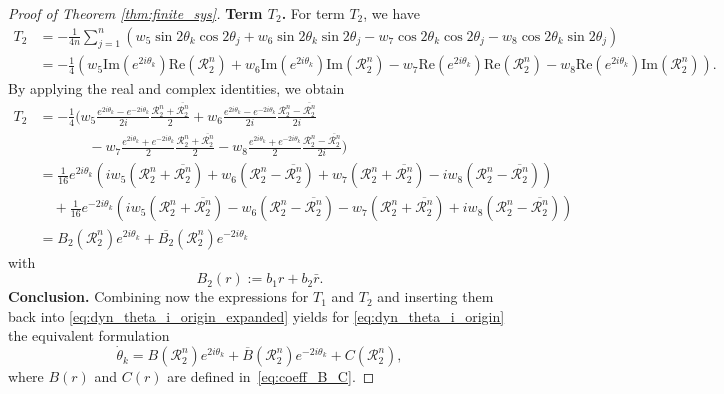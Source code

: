 \documentclass[10pt]{article}
\theoremstyle{definition}
\theoremstyle{definition}
\numberwithin{equation}{section}
\newcommand{\CR}{\mathcal{R}}
\newcommand{\im}[1]{\mathrm{Im} \left(#1\right)}
\newcommand{\re}[1]{\mathrm{Re}\left(#1\right)}
\begin{document}
\begin{proof}[Proof of Theorem \ref{thm:finite_sys}]
    \textbf{Term $T_2$.}
    For term $T_2$, we have
    \begin{equation*}
    \begin{split}
        T_2
        &= -\frac{1}{4n} \sum_{j=1}^n \left(w_5 \sin 2 \theta_k \cos 2\theta_j + w_6 \sin 2 \theta_k \sin 2\theta_j - w_7 \cos 2\theta_k \cos 2\theta_j - w_8 \cos 2\theta_k \sin 2\theta_j \right)\\
        &= -\frac{1}{4} \left( w_5 \im{e^{2i\theta_k}} \re{\CR_2^n} + w_6 \im{e^{2i\theta_k}} \im{\CR_2^n} - w_7 \re{e^{2i\theta_k}} \re{\CR_2^n} -w_8 \re{e^{2i\theta_k}} \im{\CR_2^n} \right) .
    \end{split}
    \end{equation*}
    By applying the real and complex identities, we obtain
    \begin{equation*}
    \begin{aligned}
    T_2 &= -\frac{1}{4} \bigg( w_5 \frac{e^{2i\theta_k} - e^{-2i\theta_k}}{2i} \frac{\CR_2^n + \overline{\CR_2^n}}{2} + w_6 \frac{e^{2i\theta_k} - e^{-2i\theta_k}}{2i} \frac{\CR_2^n - \overline{\CR_2^n}}{2i}\\
    &\qquad \quad \; \; - w_7 \frac{e^{2i\theta_k} + e^{-2i\theta_k}}{2} \frac{\CR_2^n + \overline{\CR_2^n}}{2} - w_8 \frac{e^{2i\theta_k} + e^{-2i\theta_k}}{2} \frac{\CR_2^n - \overline{\CR_2^n}}{2i}\bigg)\\
    &= \frac{1}{16} e^{2i\theta_k} \left( iw_5 \left( \CR_2^n + \overline{\CR_2^n} \right) + w_6 \left( \CR_2^n - \overline{\CR_2^n} \right) + w_7 \left( \CR_2^n + \overline{\CR_2^n} \right) - iw_8 \left( \CR_2^n - \overline{\CR_2^n} \right)\right)\\
    &\quad + \frac{1}{16} e^{-2i \theta_k} \left( iw_5 \left( \CR_2^n + \overline{\CR_2^n} \right) - w_6 \left( \CR_2^n - \overline{\CR_2^n} \right) - w_7 \left( \CR_2^n + \overline{\CR_2^n} \right) + iw_8 \left( \CR_2^n - \overline{\CR_2^n} \right)\right)\\
    &= B_2(\CR_2^n)e^{2i\theta_k} + \overline{B_2}(\CR_2^n)e^{-2i\theta_k} 
    \end{aligned}
    \end{equation*}
    with
    \begin{equation*}
        B_2(r)
        := b_1 r + b_2 \bar{r}.
    \end{equation*}
    \textbf{Conclusion.} Combining now the expressions for $T_1$ and $T_2$
    and inserting them back into \eqref{eq:dyn_theta_i_origin_expanded} yields for \eqref{eq:dyn_theta_i_origin} the equivalent formulation
    \begin{equation*}
        \dot \theta_k
        = B(\CR_2^n)e^{2i\theta_k} + \overline{B}(\CR_2^n)e^{-2i\theta_k} + C(\CR_2^n),
    \end{equation*}
    where $B(r)$ and $C(r)$ are defined in~\eqref{eq:coeff_B_C}.
\end{proof}
\end{document}
